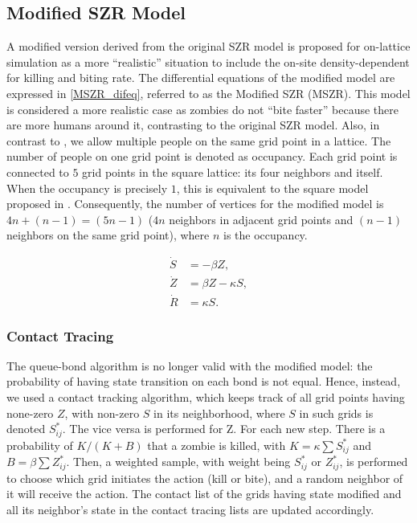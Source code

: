 \documentclass[11pt]{article}
\begin{document}
\subsection{Modified SZR Model}
A modified version derived from the original SZR model is proposed for on-lattice simulation as a more ``realistic'' situation to include the on-site density-dependent for killing and biting rate. The differential equations of the modified model are expressed in \ref{MSZR_difeq}, referred to as the Modified SZR (MSZR). This model is considered a more realistic case as zombies do not ``bite faster'' because there are more humans around it, contrasting to the original SZR model. Also, in contrast to \cite{Zombies}, we allow multiple people on the same grid point in a lattice. The number of people on one grid point is denoted as occupancy. Each grid point is connected to $5$ grid points in the square lattice: its four neighbors and itself. When the occupancy is precisely $1$, this is equivalent to the square model proposed in \cite{Zombies}. Consequently, the number of vertices for the modified model is $4n+(n-1)=(5n-1)$ ($4n$ neighbors in adjacent grid points and $(n-1)$ neighbors on the same grid point), where $n$ is the occupancy.

\begin{align}
    \dot{S} & = -\beta Z,         \\
    \dot{Z} & = \beta Z-\kappa S, \\
    \dot{R} & = \kappa S.
    \label{MSZR_difeq}
\end{align}

\subsubsection{Contact Tracing}
The queue-bond algorithm is no longer valid with the modified model: the probability of having state transition on each bond is not equal. Hence, instead, we used a contact tracking algorithm, which keeps track of all grid points having none-zero $Z$, with non-zero $S$ in its neighborhood, where $S$ in such grids is denoted $S_{ij}^*$. The vice versa is performed for Z. For each new step. There is a probability of $K/(K+B)$ that a zombie is killed, with $K=\kappa\sum S_{ij}^*$ and $B=\beta\sum Z_{ij}^*$. Then, a weighted sample, with weight being ${S_{ij}^*}$ or ${Z_{ij}^*}$, is performed to choose which grid initiates the action (kill or bite), and a random neighbor of it will receive the action. The contact list of the grids having state modified and all its neighbor's state in the contact tracing lists are updated accordingly.\par
\end{document}

